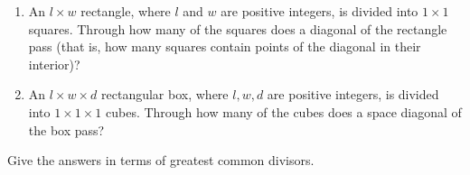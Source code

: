 \begin{enumerate}
\item[(a)] An $l\times w$ rectangle, where $l$ and $w$ are positive integers, is divided into $1\times1$ squares. Through how many of the squares does a diagonal of the rectangle pass (that is, how many squares contain points of the diagonal in their interior)?
\item[(b)] An $l\times w\times d$ rectangular box, where $l,w,d$ are positive integers, is divided into $1\times1\times1$ cubes. Through how many of the cubes does a space diagonal of the box pass?
\end{enumerate}
Give the answers in terms of greatest common divisors.
